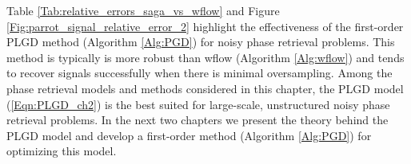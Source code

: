 Table \ref{Tab:relative_errors_saga_vs_wflow} and Figure \ref{Fig:parrot_signal_relative_error_2} highlight the effectiveness of the first-order PLGD method (Algorithm \ref{Alg:PGD}) for noisy phase retrieval problems.  
This method is typically is more robust than wflow (Algorithm \ref{Alg:wflow}) and tends to recover signals successfully when there is minimal oversampling. 
Among the phase retrieval models and methods considered in this chapter, the PLGD model (\ref{Eqn:PLGD_ch2}) is the best suited for large-scale, unstructured noisy phase retrieval problems.
In the next two chapters we present the theory behind the PLGD model and develop a first-order method (Algorithm \ref{Alg:PGD}) for optimizing this model.


